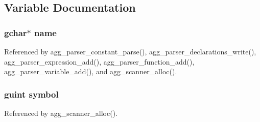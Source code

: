 \subsection{Variable Documentation}
\subsubsection[{name}]{\setlength{\rightskip}{0pt plus 5cm}gchar$\ast$ name}\label{parser_8c_abe91710dad809409dba210f43e519079}


Referenced by agg\+\_\+parser\+\_\+constant\+\_\+parse(), agg\+\_\+parser\+\_\+declarations\+\_\+write(), agg\+\_\+parser\+\_\+expression\+\_\+add(), agg\+\_\+parser\+\_\+function\+\_\+add(), agg\+\_\+parser\+\_\+variable\+\_\+add(), and agg\+\_\+scanner\+\_\+alloc().

\subsubsection[{symbol}]{\setlength{\rightskip}{0pt plus 5cm}guint symbol}\label{parser_8c_a3ca92672f63765ba1686c977e7d129fa}


Referenced by agg\+\_\+scanner\+\_\+alloc().

